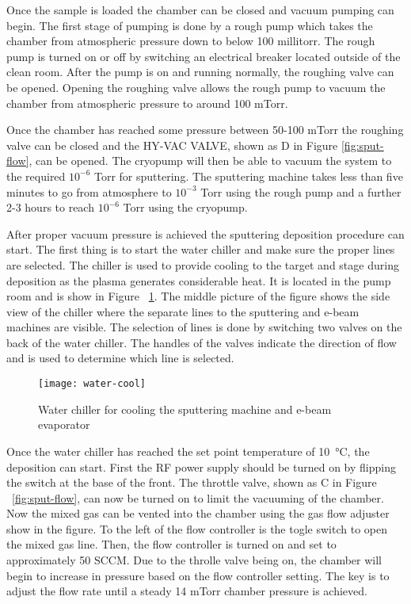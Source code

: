 Once the sample is loaded the chamber can be closed and vacuum pumping can begin.
The first stage of pumping is done by a rough pump which takes the chamber from atmospheric pressure down to below 100 millitorr.
The rough pump is turned on or off by switching an electrical breaker located outside of the clean room.
After the pump is on and running normally, the roughing valve can be opened.
Opening the roughing valve allows the rough pump to vacuum the chamber from atmospheric pressure to around 100 mTorr.

Once the chamber has reached some pressure between 50-100 mTorr the roughing valve can be closed and the HY-VAC VALVE, shown as D in Figure \ref{fig:sput-flow}, can be opened.
The cryopump will then be able to vacuum the system to the required $10^{-6}$ Torr for sputtering.
The sputtering machine takes less than five minutes to go from atmosphere to $10^{-3}$ Torr using the rough pump and a further 2-3 hours to reach $10^{-6}$ Torr using the cryopump.

After proper vacuum pressure is achieved the sputtering deposition procedure can start.
The first thing is to start the water chiller and make sure the proper lines are selected.
The chiller is used to provide cooling to the target and stage during deposition as the plasma generates considerable heat.
It is located in the pump room and is show in Figure ~\ref{fig:water-cool}.
The middle picture of the figure shows the side view of the chiller where the separate lines to the sputtering and e-beam machines are visible.
The selection of lines is done by switching two valves on the back of the water chiller.
The handles of the valves indicate the direction of flow and is used to determine which line is selected.
\begin{figure}[htpb]
\centering
\texttt{[image: water-cool]}
\caption{Water chiller for cooling the sputtering machine and e-beam evaporator}
\label{fig:water-cool}
\end{figure}

Once the water chiller has reached the set point temperature of \SI{10}{\celsius}, the deposition can start.
First the RF power supply should be turned on by flipping the switch at the base of the front.
The throttle valve, shown as C in Figure ~\ref{fig:sput-flow}, can now be turned on to limit the vacuuming of the chamber.
Now the mixed gas can be vented into the chamber using the gas flow adjuster show in the figure.
To the left of the flow controller is the togle switch to open the mixed gas line.
Then, the flow controller is turned on and set to approximately 50 SCCM.
Due to the throlle valve being on, the chamber will begin to increase in pressure based on the flow controller setting.
The key is to adjust the flow rate until a steady 14 mTorr chamber pressure is achieved.

